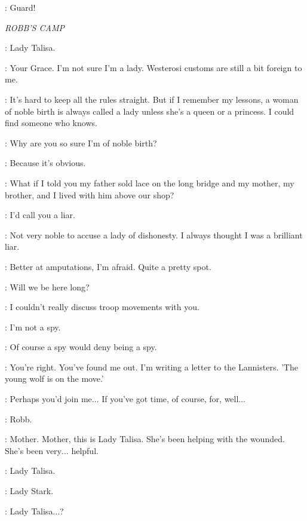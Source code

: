 
\TYWIN: Guard! 


\scene

\textit{ROBB'S CAMP} 


\ROBB: Lady Talisa. 

\TALISA: Your Grace. I'm not sure I'm a lady. Westerosi customs are still a bit foreign to me. 

\ROBB: It's hard to keep all the rules straight. But if I remember my lessons, a woman of noble birth is always called a lady unless she's a queen or a princess. I could find someone who knows. 

\TALISA: Why are you so sure I'm of noble birth? 

\ROBB: Because it's obvious. 

\TALISA: What if I told you my father sold lace on the long bridge and my mother, my brother, and I lived with him above our shop? 

\ROBB: I'd call you a liar. 

\TALISA: Not very noble to accuse a lady of dishonesty. I always thought I was a brilliant liar. 

\ROBB: Better at amputations, I'm afraid. Quite a pretty spot. 

\TALISA: Will we be here long? 

\ROBB: I couldn't really discuss troop movements with you. 

\TALISA: I'm not a spy. 

\ROBB: Of course a spy would deny being a spy. 

\TALISA: You're right. You've found me out. I'm writing a letter to the Lannisters. 'The young wolf is on the move.' 

\ROBB: Perhaps you'd join me$\ldots$ If you've got time, of course, for, well$\ldots$ 


\CATELYN: Robb. 

\ROBB: Mother. Mother, this is Lady Talisa. She's been helping with the wounded. She's been very$\ldots$ helpful. 

\CATELYN: Lady Talisa. 

\TALISA: Lady Stark. 

\CATELYN: Lady Talisa$\ldots$? 

